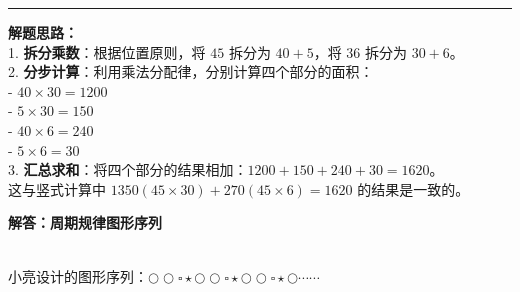 \begin{center}
\begin{minipage}{0.55\textwidth}
  \end{minipage}
\end{center}

\vspace{1.0cm}
\hrule
\vspace{0.4cm}

{\small
\textbf{解题思路：} \\
1. \textbf{拆分乘数}：根据位置原则，将 $45$ 拆分为 $40 + 5$，将 $36$ 拆分为 $30 + 6$。 \\
2. \textbf{分步计算}：利用乘法分配律，分别计算四个部分的面积： \\
   - $40 \times 30 = 1200$ \\
   - $5 \times 30 = 150$ \\
   - $40 \times 6 = 240$ \\
   - $5 \times 6 = 30$ \\
3. \textbf{汇总求和}：将四个部分的结果相加：$1200 + 150 + 240 + 30 = 1620$。 \\
这与竖式计算中 $1350 (45 \times 30) + 270 (45 \times 6) = 1620$ 的结果是一致的。
}



\newpage

\newpage

\begin{center}
  {\large\bfseries 解答：周期规律图形序列}
\end{center}

\vspace{0.6cm}

\\
{\small 小亮设计的图形序列：$\bigcirc \bigcirc \square \star \bigcirc \bigcirc \square \star \bigcirc \bigcirc \square \star \bigcirc \cdots\cdots$}

